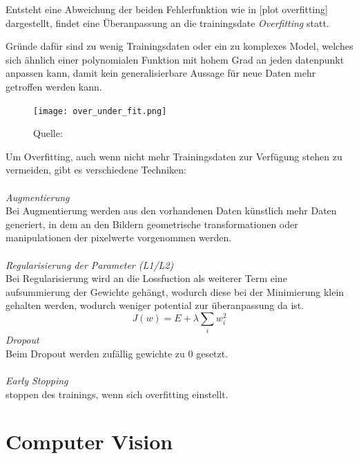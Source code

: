 Entsteht eine Abweichung der beiden Fehlerfunktion wie in 
[plot overfitting] dargestellt, findet eine Überanpassung 
an die trainingsdate \textit{Overfitting} statt.

Gründe dafür sind zu wenig Trainingsdaten oder ein zu komplexes Model, 
welches sich ähnlich einer polynomialen Funktion mit hohem Grad 
an jeden datenpunkt anpassen kann, damit kein generalisierbare 
Aussage für neue Daten mehr getroffen werden kann.


\begin{figure}[htb]
    \centering
    \texttt{[image: over\_under\_fit.png]}
    \caption{Quelle: \cite{deshpGuideImprovingDeep2017a}}
    \label{fig:over_under_fit}
\end{figure}


Um Overfitting, auch wenn nicht mehr Trainingsdaten 
zur Verfügung stehen zu vermeiden, gibt es verschiedene
Techniken:\\\\
\textit{Augmentierung}\\
Bei Augmentierung werden aus den vorhandenen Daten künstlich mehr 
Daten generiert, in dem an den Bildern geometrische transformationen 
oder manipulationen der pixelwerte vorgenommen werden.
\\\\
\textit{Regularisierung der Parameter (L1/L2)}\\
Bei Regularisierung wird an die Lossfuction als weiterer Term
 eine aufsummierung der Gewichte gehängt, wodurch diese bei der Minimierung 
  klein gehalten werden, wodurch weniger potential zur überanpassung da ist.
  \begin{equation}
    \label{eq:regularization}
    J(w) = E + \lambda \sum_{i} w_{i}^{2}
\end{equation}
\textit{Dropout}\\
Beim Dropout werden zufällig gewichte zu 0 gesetzt.
\\\\
\textit{Early Stopping}\\
stoppen des trainings, wenn sich overfitting einstellt.



\section{Computer Vision}

